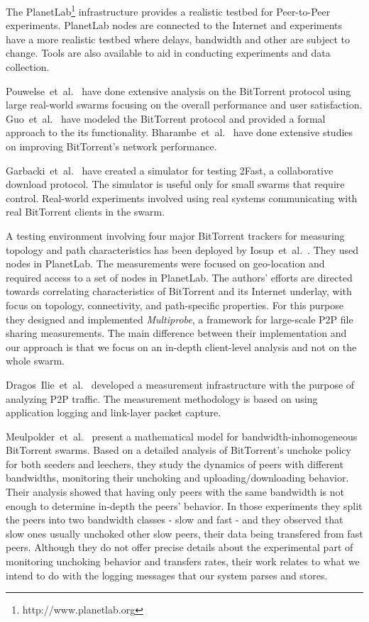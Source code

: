 The PlanetLab\footnote{http://www.planetlab.org} infrastructure provides a
realistic testbed for Peer-to-Peer experiments. PlanetLab nodes are connected
to the Internet and experiments have a more realistic testbed where delays,
bandwidth and other are subject to change. Tools are also available to aid in
conducting experiments and data collection.

Pouwelse~et~al.~\cite{measurement-study} have done extensive analysis on the
BitTorrent protocol using large real-world swarms focusing on the overall
performance and user satisfaction. Guo~et~al.~\cite{guo} have modeled the
BitTorrent protocol and provided a formal approach to the its functionality.
Bharambe~et~al.~\cite{bt-analysis} have done extensive studies on improving
BitTorrent's network performance.

Garbacki~et~al.~\cite{garbacki} have created a simulator for testing 2Fast, a
collaborative download protocol. The simulator is useful only for small swarms
that require control. Real-world experiments involved using real systems
communicating with real BitTorrent clients in the swarm.

A testing environment involving four major BitTorrent trackers for measuring
topology and path characteristics has been deployed by
Iosup~et~al.~\cite{corr-overlay}. They used nodes in PlanetLab. The
measurements were focused on geo-location and required access to a set of
nodes in PlanetLab. The authors' efforts are directed towards correlating
characteristics of BitTorrent and its Internet underlay, with focus on
topology, connectivity, and path-specific properties. For this purpose they
designed and implemented \textit{Multiprobe}, a framework for large-scale P2P
file sharing measurements. The main difference between their implementation
and our approach is that we focus on an in-depth client-level analysis and not
on the whole swarm.

Dragos~Ilie~et~al.~\cite{p2p-traf-meas} developed a measurement infrastructure
with the purpose of analyzing P2P traffic. The measurement methodology is
based on using application logging and link-layer packet capture.

Meulpolder~et~al.~\cite{p2p09} present a mathematical model for
bandwidth-inhomogeneous BitTorrent swarms. Based on a detailed analysis of
BitTorrent's unchoke policy for both seeders and leechers, they study the
dynamics of peers with different bandwidths, monitoring their unchoking and
uploading/downloading behavior. Their analysis showed that having only peers
with the same bandwidth is not enough to determine in-depth the peers'
behavior. In those experiments they split the peers into two bandwidth classes
- slow and fast - and they observed that slow ones usually unchoked other slow
peers, their data being transfered from fast peers. Although they do not offer
precise details about the experimental part of monitoring unchoking behavior
and transfers rates, their work relates to what we intend to do with the
logging messages that our system parses and stores. 

